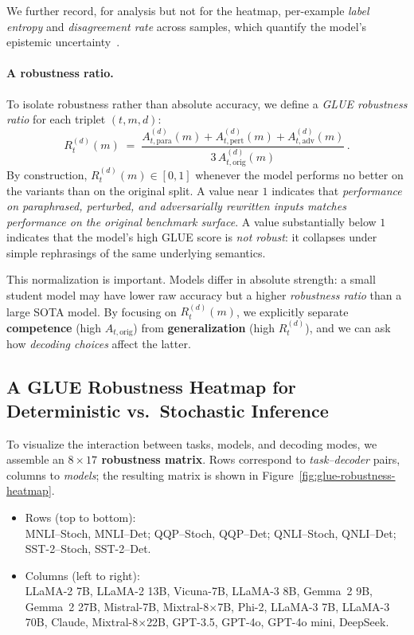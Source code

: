 We further record, for analysis but not for the heatmap, per-example
\emph{label entropy} and \emph{disagreement rate} across samples, which
quantify the model's epistemic uncertainty~\cite{atil2024stability}.

\paragraph{A robustness ratio.}
To isolate robustness rather than absolute accuracy, we define a
\emph{GLUE robustness ratio} for each triplet $(t,m,d)$:
\[\boxed{
  R_t^{(d)}(m)
  \;=\;
  \frac{
    A_{t,\text{para}}^{(d)}(m)
    + A_{t,\text{pert}}^{(d)}(m)
    + A_{t,\text{adv}}^{(d)}(m)
  }{
    3 \, A_{t,\text{orig}}^{(d)}(m)
  }\,.
  }
\]
By construction, $R_t^{(d)}(m) \in [0,1]$ whenever the model performs
no better on the variants than on the original split. A value near
$1$ indicates that \emph{performance on paraphrased, perturbed, and
adversarially rewritten inputs matches performance on the original
benchmark surface}. A value substantially below $1$ indicates that
the model's high GLUE score is \emph{not robust}: it collapses under
simple rephrasings of the same underlying semantics.

This normalization is important. Models differ in absolute strength:
a small student model may have lower raw accuracy but a higher
\emph{robustness ratio} than a large SOTA model. By focusing on
$R_t^{(d)}(m)$, we explicitly separate \textbf{competence}
(high $A_{t,\text{orig}}$) from \textbf{generalization}
(high $R_t^{(d)}$), and we can ask how \emph{decoding choices} affect
the latter.

\subsection{A GLUE Robustness Heatmap for Deterministic vs.~Stochastic Inference}
\label{subsec:glue-heatmap}

To visualize the interaction between tasks, models, and decoding modes,
we assemble an \textbf{$8 \times 17$ robustness matrix}. Rows correspond
to \emph{task--decoder} pairs, columns to \emph{models}; the resulting
matrix is shown in Figure~\ref{fig:glue-robustness-heatmap}.

\begin{itemize}[leftmargin=1.5em]
  \item Rows (top to bottom):\\
        MNLI--Stoch, MNLI--Det;
        QQP--Stoch, QQP--Det;
        QNLI--Stoch, QNLI--Det;
        SST-2--Stoch, SST-2--Det.
  \item Columns (left to right):\\
        LLaMA-2 7B, LLaMA-2 13B, Vicuna-7B, LLaMA-3 8B,
        Gemma~2 9B, Gemma~2 27B, Mistral-7B, Mixtral-8$\times$7B,
        Phi-2, LLaMA-3 7B, LLaMA-3 70B, Claude, Mixtral-8$\times$22B,
        GPT-3.5, GPT-4o, GPT-4o mini, DeepSeek.
\end{itemize}




